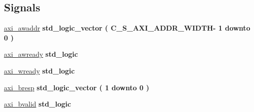 \subsection*{Signals}
 \begin{DoxyCompactItemize}
\item 
\hypertarget{group__my_g_p_i_o_gac022af52d7126cf515130cdd10e089fc}{\hyperlink{group__my_g_p_i_o_gac022af52d7126cf515130cdd10e089fc}{axi\+\_\+awaddr} {\bfseries \textcolor{vhdlchar}{std\+\_\+logic\+\_\+vector}\textcolor{vhdlchar}{ }\textcolor{vhdlchar}{(}\textcolor{vhdlchar}{ }\textcolor{vhdlchar}{ }\textcolor{vhdlchar}{ }\textcolor{vhdlchar}{ }\textcolor{vhdlchar}{C\+\_\+\+S\+\_\+\+A\+X\+I\+\_\+\+A\+D\+D\+R\+\_\+\+W\+I\+D\+T\+H}\textcolor{vhdlchar}{-\/}\textcolor{vhdlchar}{ } \textcolor{vhdldigit}{1} \textcolor{vhdlchar}{ }\textcolor{vhdlchar}{downto}\textcolor{vhdlchar}{ }\textcolor{vhdlchar}{ } \textcolor{vhdldigit}{0} \textcolor{vhdlchar}{ }\textcolor{vhdlchar}{)}\textcolor{vhdlchar}{ }} }\label{group__my_g_p_i_o_gac022af52d7126cf515130cdd10e089fc}

\item 
\hypertarget{group__my_g_p_i_o_gabe920675e5bffe2b708237782acd713d}{\hyperlink{group__my_g_p_i_o_gabe920675e5bffe2b708237782acd713d}{axi\+\_\+awready} {\bfseries \textcolor{vhdlchar}{std\+\_\+logic}\textcolor{vhdlchar}{ }} }\label{group__my_g_p_i_o_gabe920675e5bffe2b708237782acd713d}

\item 
\hypertarget{group__my_g_p_i_o_ga65364960779319dfc2c67e7d943d0499}{\hyperlink{group__my_g_p_i_o_ga65364960779319dfc2c67e7d943d0499}{axi\+\_\+wready} {\bfseries \textcolor{vhdlchar}{std\+\_\+logic}\textcolor{vhdlchar}{ }} }\label{group__my_g_p_i_o_ga65364960779319dfc2c67e7d943d0499}

\item 
\hypertarget{group__my_g_p_i_o_gae5e5ea90e34af927db9507875d261a1a}{\hyperlink{group__my_g_p_i_o_gae5e5ea90e34af927db9507875d261a1a}{axi\+\_\+bresp} {\bfseries \textcolor{vhdlchar}{std\+\_\+logic\+\_\+vector}\textcolor{vhdlchar}{ }\textcolor{vhdlchar}{(}\textcolor{vhdlchar}{ }\textcolor{vhdlchar}{ } \textcolor{vhdldigit}{1} \textcolor{vhdlchar}{ }\textcolor{vhdlchar}{downto}\textcolor{vhdlchar}{ }\textcolor{vhdlchar}{ } \textcolor{vhdldigit}{0} \textcolor{vhdlchar}{ }\textcolor{vhdlchar}{)}\textcolor{vhdlchar}{ }} }\label{group__my_g_p_i_o_gae5e5ea90e34af927db9507875d261a1a}

\item 
\hypertarget{group__my_g_p_i_o_gaf832611b20471b9b894f1c7b2a610c42}{\hyperlink{group__my_g_p_i_o_gaf832611b20471b9b894f1c7b2a610c42}{axi\+\_\+bvalid} {\bfseries \textcolor{vhdlchar}{std\+\_\+logic}\textcolor{vhdlchar}{ }} }\label{group__my_g_p_i_o_gaf832611b20471b9b894f1c7b2a610c42}


\end{DoxyCompactItemize}
